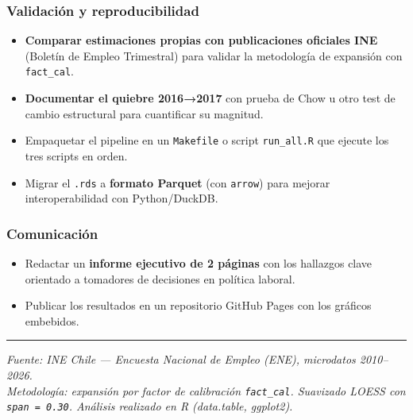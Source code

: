 \documentclass[
]{article}
\providecommand{\tightlist}{%
  \setlength{\itemsep}{0pt}\setlength{\parskip}{0pt}}
\begin{document}
\subsubsection{Validación y
reproducibilidad}\label{validaciuxf3n-y-reproducibilidad}

\begin{itemize}
\tightlist
\item[$\square$]
  \textbf{Comparar estimaciones propias con publicaciones oficiales INE}
  (Boletín de Empleo Trimestral) para validar la metodología de
  expansión con \texttt{fact\_cal}.
\item[$\square$]
  \textbf{Documentar el quiebre 2016→2017} con prueba de Chow u otro
  test de cambio estructural para cuantificar su magnitud.
\item[$\square$]
  Empaquetar el pipeline en un \texttt{Makefile} o script
  \texttt{run\_all.R} que ejecute los tres scripts en orden.
\item[$\square$]
  Migrar el \texttt{.rds} a \textbf{formato Parquet} (con
  \texttt{arrow}) para mejorar interoperabilidad con Python/DuckDB.
\end{itemize}

\subsubsection{Comunicación}\label{comunicaciuxf3n}

\begin{itemize}
\tightlist
\item[$\square$]
  Redactar un \textbf{informe ejecutivo de 2 páginas} con los hallazgos
  clave orientado a tomadores de decisiones en política laboral.
\item[$\square$]
  Publicar los resultados en un repositorio GitHub Pages con los
  gráficos embebidos.
\end{itemize}

\begin{center}\rule{0.5\linewidth}{0.5pt}\end{center}

\emph{Fuente: INE Chile --- Encuesta Nacional de Empleo (ENE),
microdatos 2010--2026.}\\
\emph{Metodología: expansión por factor de calibración
\texttt{fact\_cal}. Suavizado LOESS con \texttt{span\ =\ 0.30}. Análisis
realizado en R (data.table, ggplot2).}
\end{document}
